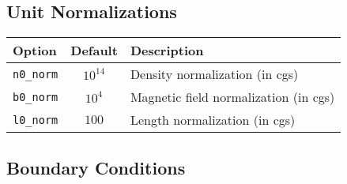 \subsection{Unit Normalizations}
\begin{tabular}{lcp{4in}}
  \textbf{Option}&\textbf{Default}&\textbf{Description}\\
  \hline
  \texttt{n0\_norm} & $10^{14}$ & Density normalization (in cgs)\\
  \texttt{b0\_norm} & $10^4$    & Magnetic field normalization (in cgs)\\
  \texttt{l0\_norm} & $100$     & Length normalization (in cgs)
\end{tabular}

\subsection{Boundary Conditions}

